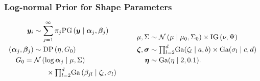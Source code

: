 \documentclass[aspectratio=169]{beamer}
\begin{document}
\begin{frame}
  \frametitle{Log-normal Prior for Shape Parameters}
  \begin{equation*}
    \begin{aligned}
      \bm{ y}_i &\sim \sum_{j = 1}^{\infty}\pi_j\text{PG}\left(\bm{ y}\mid \bm{ \alpha}_j, \bm{\beta}_j\right)\\
      (\bm{\alpha}_j, \bm{\beta}_j) &\sim \text{DP}\left(\eta, G_0\right)\\
        &~\hspace{-1cm}G_0 = \mathcal{N}\left(\log\bm{ \alpha}_{j}\mid\mu,\Sigma\right)\\
        &~\hspace{0.5cm}\times
            {\textstyle\prod}_{l = 2}^d\text{Ga}\left(\beta_{jl}\mid\zeta_l,\sigma_l\right)
    \end{aligned}
    \hspace{1cm}
    \begin{aligned}
      \mu,\Sigma &\sim \mathcal{N}\left(\mu\mid\mu_0,\Sigma_0\right)
                                  \times \text{IG}\left(\nu,\Psi\right)\\
      \bm{ \zeta},\bm{\sigma} &\sim {\textstyle\prod}_{l = 2}^d\text{Ga}(\zeta_l \mid a,b)
                                \times \text{Ga}(\sigma_l \mid c,d) \\
      \bm{ \eta} &\sim \text{Ga}(\eta \mid 2, 0.1).
    \end{aligned}
  \end{equation*}
\end{frame}
\end{document}
